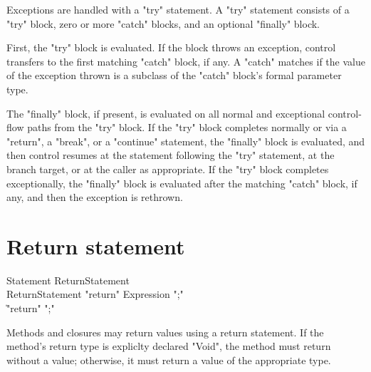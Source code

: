 Exceptions are handled with a \xcd"try" statement.
A \xcd"try" statement consists of a \xcd"try" block, zero or more
\xcd"catch" blocks, and an optional \xcd"finally" block.

First, the \xcd"try" block is evaluated.  If the block throws an
exception, control transfers to the first matching \xcd"catch"
block, if any.  A \xcd"catch" matches if the value of the
exception thrown is a subclass of the \xcd"catch" block's formal
parameter type.

The \xcd"finally" block, if present, is evaluated on all normal
and exceptional control-flow paths from the \xcd"try" block.
If the \xcd"try" block completes normally
or via a \xcd"return", a \xcd"break", or a
\xcd"continue" statement, 
the \xcd"finally"
block is evaluated, and then control resumes at
the statement following the \xcd"try" statement, at the branch target, or at
the caller as appropriate.
If the \xcd"try" block completes
exceptionally, the \xcd"finally" block is evaluated after the
matching \xcd"catch" block, if any, and then the
exception is rethrown.

\section{Return statement}
\label{ReturnStatement}
\begin{grammar}
Statement \: ReturnStatement \\
ReturnStatement \: \xcd"return" Expression \xcd";" \\
             \| \xcd"return" \xcd";" \\
\end{grammar}

Methods and closures may return values using a return statement.
If the method's return type is expliclty declared \xcd"Void",
the method must return without a value; otherwise, it must return
a value of the appropriate type.
